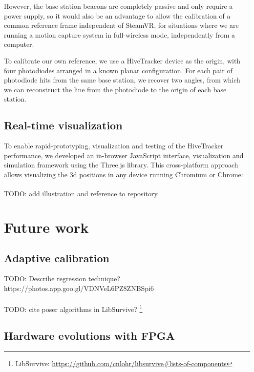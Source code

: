 \documentclass[sigchi]{acmart}
\begin{document}
However, the base station beacons are completely passive and only require a power supply, so it would also be an advantage to allow the calibration of a common reference frame independent of SteamVR, for situations where we are running a motion capture system in full-wireless mode, independently from a computer.

To calibrate our own reference, we use a HiveTracker device as the origin, with four photodiodes arranged in a known planar configuration. For each pair of photodiode hits from the same base station, we recover two angles, from which we can reconstruct the line from the photodiode to the origin of each base station.

\subsection{Real-time visualization}

To enable rapid-prototyping, visualization and testing of the HiveTracker performance, we developed an in-browser JavaScript interface, visualization and simulation framework using the Three.js library. This cross-platform approach allows visualizing the 3d positions in any device running Chromium or Chrome:
\\\\
TODO: add illustration and reference to repository \cite{WebappRepo}

\section{Future work}

\subsection{Adaptive calibration}

TODO: Describe regression technique?\\
https://photos.app.goo.gl/VDNVeL6PZ8ZNBSpi6
\\\\
TODO: cite poser algorithms in LibSurvive? \footnote{LibSurvive: \url{https://github.com/cnlohr/libsurvive\#lists-of-components}}

\subsection{Hardware evolutions with FPGA}
\end{document}
